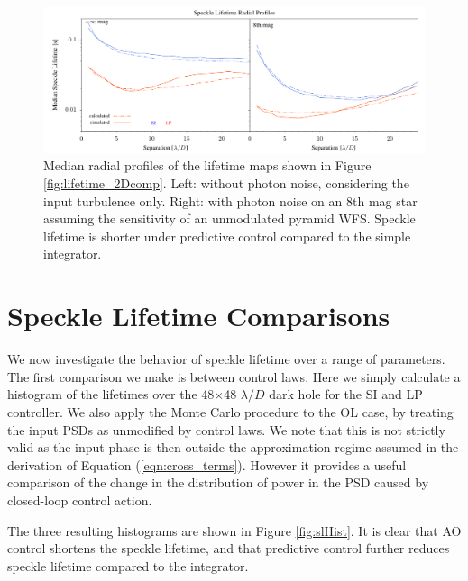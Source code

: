 \documentclass[10pt,preprint]{aastex631}
\begin{document}
\begin{figure}
\hspace{-0.3in}
\includegraphics[width=6.5in]{lifetimesRP.pdf}
\caption{Median radial profiles of the lifetime maps shown in Figure \ref{fig:lifetime_2Dcomp}.  Left: without photon noise, considering the input turbulence only.  Right: with photon noise on an 8th mag star assuming the sensitivity of an unmodulated pyramid WFS. Speckle lifetime is shorter under predictive control compared to the simple integrator. \label{fig:lifetime_radprof}}
\end{figure}


\section{Speckle Lifetime Comparisons}
\label{sec:trends}

We now investigate the behavior of speckle lifetime over a range of parameters.  The first comparison we make is between control laws.  Here we simply calculate a histogram of the lifetimes over the 48$\times$48 $\lambda/D$ dark hole for the SI and LP controller.  We also apply the Monte Carlo procedure to the OL case, by treating the input PSDs as unmodified by control laws.  We note that this is not strictly valid as the input phase is then outside the approximation regime assumed in the derivation of Equation (\ref{eqn:cross_terms}).  However it provides a useful comparison of the change in the distribution of power in the PSD caused by closed-loop control action. 

The three resulting histograms are shown in Figure \ref{fig:slHist}.  It is clear that AO control shortens the speckle lifetime, and that predictive control further reduces speckle lifetime compared to the integrator.
\end{document}
